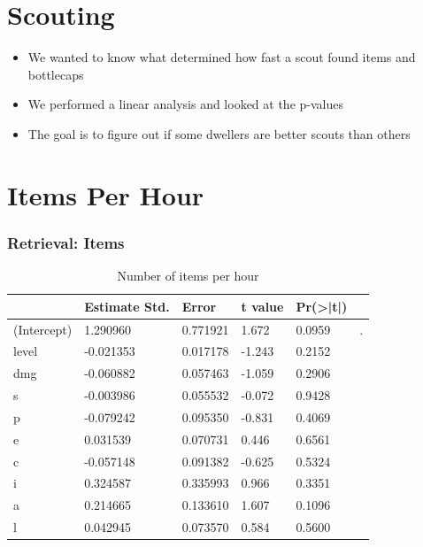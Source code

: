 \documentclass{beamer}
\begin{document}
\section{Scouting}
\begin{frame}
  \begin{itemize}
  \item We wanted to know what determined how fast a scout found items and bottlecaps
  \item We performed a linear analysis and looked at the p-values
  \item The goal is to figure out if some dwellers are better scouts than others
  \end{itemize}

\end{frame}

\section{Items Per Hour}
\begin{frame}
  \frametitle{Retrieval: Items}
  \begin{table}
\caption{Number of items per hour}
\label{table:n.items}
\begin{tabular}{l|lllll}
&Estimate Std.&Error&t value&Pr(>|t|) &\\ 
\hline
(Intercept)&1.290960 &0.771921 &1.672&0.0959&.\\
level&-0.021353  & 0.017178 & -1.243 &  0.2152&  \\
dmg&-0.060882  & 0.057463 & -1.059 &  0.2906&  \\
s&-0.003986  & 0.055532 & -0.072  & 0.9428&  \\
p&-0.079242 &  0.095350 & -0.831 &  0.4069 & \\
e&0.031539 &  0.070731 &  0.446  & 0.6561&  \\
c& -0.057148  & 0.091382 & -0.625 &  0.5324&  \\
i&0.324587&0.335993&   0.966&   0.3351&  \\
a&0.214665&0.133610 &  1.607&   0.1096&  \\
l&0.042945&0.073570&0.584&0.5600&\\
\hline
\end{tabular}
\end{table}
\end{frame}
\end{document}
